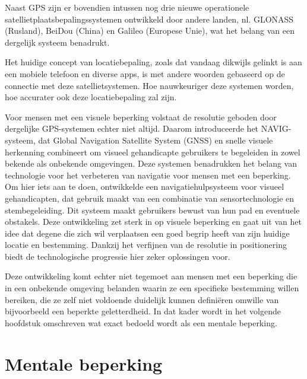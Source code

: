Naast GPS zijn er bovendien intussen nog drie nieuwe operationele satellietplaatsbepalingssystemen ontwikkeld door andere landen, nl. GLONASS (Rusland), BeiDou (China) en Galileo (Europese Unie), wat het belang van een dergelijk systeem benadrukt. 

Het huidige concept van locatiebepaling, zoals dat vandaag dikwijls gelinkt is aan een mobiele telefoon en diverse apps, is met andere woorden gebaseerd op de connectie met deze satellietsystemen. Hoe nauwkeuriger deze systemen worden, hoe accurater ook deze locatiebepaling zal zijn. 

Voor mensen met een visuele beperking volstaat de resolutie geboden door dergelijke GPS-systemen echter niet altijd. Daarom introduceerde \textcite{Katz2010} het NAVIG-systeem, dat Global Navigation Satellite System (GNSS) en snelle visuele herkenning combineert om visueel gehandicapte gebruikers te begeleiden in zowel bekende als onbekende omgevingen. Deze systemen benadrukken het belang van technologie voor het verbeteren van navigatie voor mensen met een beperking. Om hier iets aan te doen, ontwikkelde  
\textcite{Lakde2015} een navigatiehulpsysteem voor visueel gehandicapten, dat gebruik maakt van een combinatie van sensortechnologie en stembegeleiding. Dit systeem maakt gebruikers bewust van hun pad en eventuele obstakels. Deze ontwikkeling zet sterk in op visuele beperking en gaat uit van het idee dat degene die zich wil verplaatsen een goed begrip heeft van zijn huidige locatie en bestemming. Dankzij het verfijnen van de resolutie in positionering biedt de technologische progressie hier zeker oplossingen voor. 

Deze ontwikkeling komt echter niet tegemoet aan mensen met een beperking die in een onbekende omgeving belanden waarin ze een specifieke bestemming willen bereiken, die ze zelf niet voldoende duidelijk kunnen definiëren omwille van bijvoorbeeld een beperkte geletterdheid. In dat kader wordt in het volgende hoofdstuk omschreven wat exact bedoeld wordt als een mentale beperking. 

\section{Mentale beperking}
\label{sec:mentale-beperking}


